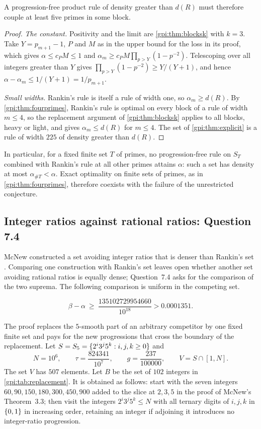 A progression-free product rule of density greater than $d(R)$ must therefore couple at least five
primes in some block.

\begin{proof}
\emph{The constant.} Positivity and the limit are \cref{gpi:thm:blocksk} with $k=3$. Take
$Y=p_{m+1}-1$, $P$ and $M$ as in the upper bound for the loss in its proof, which gives
$\alpha\le c_PM\le1$ and $\alpha_m\ge c_PM\prod_{p>Y}(1-p^{-2})$. Telescoping over all integers
greater than $Y$ gives $\prod_{p>Y}(1-p^{-2})\ge Y/(Y+1)$, and hence
$\alpha-\alpha_m\le1/(Y+1)=1/p_{m+1}$.

\emph{Small widths.} Rankin's rule is itself a rule of width one, so $\alpha_m\ge d(R)$. By
\cref{gpi:thm:fourprimes}, Rankin's rule is optimal on every block of a rule of width $m\le4$, so the
replacement argument of \cref{gpi:thm:blocksk} applies to all blocks, heavy or light, and gives
$\alpha_m\le d(R)$ for $m\le4$. The set of \cref{gpi:thm:explicit} is a rule of width $225$ of density
greater than $d(R)$.
\end{proof}

In particular, for a fixed finite set $T$ of primes, no progression-free rule on $S_T$ combined with
Rankin's rule at all other primes attains $\alpha$: such a set has density at most
$\alpha_{\#T}<\alpha$. Exact optimality on finite sets of primes, as in \cref{gpi:thm:fourprimes},
therefore coexists with the failure of the unrestricted conjecture.

\subsection{Integer ratios against rational ratios: Question 7.4}\label{gpi:sec:q74}
{\raggedright{}}

McNew constructed a set avoiding integer ratios that is denser than Rankin's set
\cite[Theorem~3.3]{McNew2015Sets}. Comparing one construction with Rankin's set leaves open
whether another set avoiding rational ratios is equally dense; Question~7.4 asks for the
comparison of the two suprema. The following comparison is uniform in the competing set.

\begin{theorem}\label{gpi:thm:beta-alpha}
\[
 \beta-\alpha\ \ge\ \frac{135102729954660}{10^{18}}>0.0001351 .
\]
\end{theorem}

The proof replaces the $5$-smooth part of an arbitrary competitor by one fixed finite set
and pays for the new progressions that cross the boundary of the replacement. Let
$S=S_5=\{2^i3^j5^k:i,j,k\ge0\}$ and
\[
 N=10^6,\qquad\tau=\frac{824341}{10^7},\qquad g=\frac{237}{100000},\qquad V=S\cap[1,N].
\]
The set $V$ has $507$ elements. Let $B$ be the set of $102$ integers in
\cref{gpi:tab:replacement}. It is obtained as follows: start with the seven integers
$60,90,150,180,300,450,900$ added to the slice at $2,3,5$ in the proof of McNew's
Theorem~3.3; then visit the integers $2^i3^j5^k\le N$ with all ternary digits of $i,j,k$ in
$\{0,1\}$ in increasing order, retaining an integer if adjoining it introduces no
integer-ratio progression.

